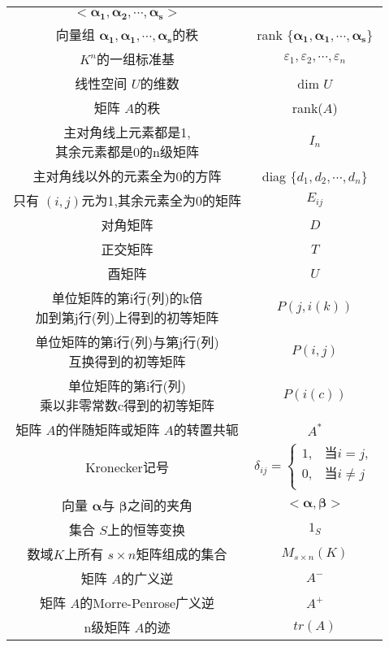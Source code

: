 \documentclass[a4paper,11pt]{article}%
\theoremstyle{remark}
\theoremstyle{definition}
\theoremstyle{definition}
\theoremstyle{plain}
\begin{document}
\begin{longtable}{cc}
       $<\bm{\alpha_1},\bm{\alpha_2},\cdots,\bm{\alpha_s}>$
       \\
       向量组 $\bm{\alpha_1},\bm{\alpha_1},\cdots,\bm{\alpha_s}$的秩
       &
       rank $\{\bm{\alpha_1},\bm{\alpha_1},\cdots,\bm{\alpha_s}\}$
       \\
       $K^n$的一组标准基 & $\varepsilon_1,\varepsilon_2,\cdots,\varepsilon_n$
       \\
       线性空间 $U$的维数& dim $U$\\
       矩阵 $A$的秩& rank($A$)\\
       \makecell{主对角线上元素都是1,\\其余元素都是0的n级矩阵}&$I_n$\\
       主对角线以外的元素全为0的方阵& diag $\{d_1,d_2,\cdots,d_n\}$\\
       只有 $(i,j)$元为1,其余元素全为0的矩阵& $E _{ij}$\\
       对角矩阵&$D$\\
       正交矩阵&$T$\\
       酉矩阵& $U$\\
       \makecell{单位矩阵的第i行(列)的k倍\\加到第j行(列)上得到的初等矩阵}&$P(j,i(k))$\\
       \makecell{单位矩阵的第i行(列)与第j行(列)\\互换得到的初等矩阵}&$P(i,j)$\\
       \makecell{单位矩阵的第i行(列)\\乘以非零常数c得到的初等矩阵}&$P(i(c))$\\
       矩阵 $A$的伴随矩阵或矩阵 $A$的转置共轭& $A^*$\\
       Kronecker记号&
        $
            \delta _{ij}=\begin{cases}
                1,&\text{当} i=j,\\
                0,&\text{当} i\neq j\\
            \end{cases}
        $
        \\
        向量 $\bm{\alpha}$与 $\bm{\beta}$之间的夹角&
        $<\bm{\alpha},\bm{\beta}>$\\
        集合 $S$上的恒等变换&$1_S$\\
        数域$K$上所有 $s\times n$矩阵组成的集合& $M _{s\times n}(K)$\\
        矩阵 $A$的广义逆 & $A^-$\\
        矩阵 $A$的Morre-Penrose广义逆& $A^+$\\
        n级矩阵 $A$的迹& $tr(A)$\\

\end{longtable}
\end{document}
